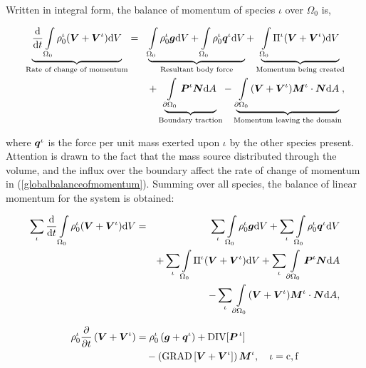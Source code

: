 Written in integral form, the balance of momentum of species $\iota$
over $\Omega_0$ is, 

\begin{eqnarray}
\underbrace{\frac{\mathrm{d}}{\mathrm{d}t} \int\limits_{\Omega_0}
\rho_0^\iota(\mbox{\boldmath$ V$}+\mbox{\boldmath$ V$}^\iota) \mathrm{d}V}_{\text{Rate of change of
    momentum}} &=& \underbrace{\int\limits_{\Omega_0} 
\rho^\iota_0\mbox{\boldmath$ g$} \mathrm{d}V + \int\limits_{\Omega_0}
\rho^\iota_0\mbox{\boldmath$ q$}^\iota \mathrm{d}V}_{\text{Resultant body force}} +
\underbrace{\int\limits_{\Omega_0} 
\Pi^\iota(\mbox{\boldmath$ V$}+\mbox{\boldmath$ V$}^\iota) \mathrm{d}V}_{\text{Momentum
    being created}} \nonumber\\
& &+ \underbrace{\int\limits_{\partial \Omega_0}\mbox{\boldmath$ P$}^\iota\mbox{\boldmath$ N$}
  \mathrm{d}A}_{\text{Boundary traction}} - 
\underbrace{\int\limits_{\partial \Omega_0}(\mbox{\boldmath$ V$}+\mbox{\boldmath$ V$}^\iota)\mbox{\boldmath$ M$}^\iota\cdot\mbox{\boldmath$ N$}
\mathrm{d}A}_{\text{Momentum leaving the domain}},
\label{globalbalanceofmomentum}
\end{eqnarray}

\noindent where $\mbox{\boldmath$ q$}^\iota$ is the force per unit mass exerted upon
$\iota$ by the other species present. Attention is drawn to the fact
that the mass source distributed through the volume, and the influx
over the boundary affect the rate of change of momentum in
(\ref{globalbalanceofmomentum}). Summing over all species, the balance
of linear momentum for the system is obtained:

\begin{eqnarray}
\sum\limits_{\iota}\frac{\mathrm{d}}{\mathrm{d}t}
\int\limits_{\Omega_0} \rho_0^\iota(\mbox{\boldmath$ V$}+\mbox{\boldmath$ V$}^\iota) \mathrm{d}V &=&
\sum\limits_{\iota}\int\limits_{\Omega_0} \rho^\iota_0\mbox{\boldmath$ g$}
\mathrm{d}V + \sum\limits_{\iota}\int\limits_{\Omega_0}
\rho^\iota_0\mbox{\boldmath$ q$}^\iota \mathrm{d}V\nonumber\\& & +
\sum\limits_{\iota}\int\limits_{\Omega_0} \Pi^\iota(\mbox{\boldmath$ V$}+\mbox{\boldmath$ V$}^\iota)
\mathrm{d}V + \sum\limits_{\iota} \int\limits_{\partial
\Omega_0}\mbox{\boldmath$ P$}^\iota\mbox{\boldmath$ N$} \mathrm{d}A\nonumber\\
& & - \sum\limits_{\iota}\int\limits_{\partial
\Omega_0}(\mbox{\boldmath$ V$}+\mbox{\boldmath$ V$}^\iota)\mbox{\boldmath$ M$}^\iota\cdot\mbox{\boldmath$ N$} \mathrm{d}A,
\label{linmombalall}
\end{eqnarray}



\begin{equation}
\begin{split}
\rho_0^\iota\frac{\partial}{\partial t}\left(\mbox{\boldmath$ V$}+\mbox{\boldmath$ V$}^\iota\right) &
=\rho^\iota_0\left(\mbox{\boldmath$ g$}+\mbox{\boldmath$ q$}^\iota\right) +
\mathrm{\small{DIV}}[\mbox{\boldmath$ P$}^{\,\iota}]\\ 
& \quad -\left(\mathrm{\small{GRAD}}\left[\mbox{\boldmath$ V$}+
  \mbox{\boldmath$ V$}^\iota\right]\right)\mbox{\boldmath$ M$}^\iota, \quad \iota = \mathrm{c,f}
\label{linearmombalance}
\end{split}
\end{equation} 

